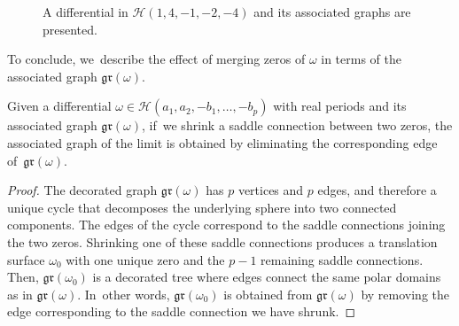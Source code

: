 \begin{ex}
\begin{figure}[ht]
\caption{A differential in $\mathcal{H}(1,4,-1,-2,-4)$ and its associated graphs are presented.} \label{fig:exgraph2}
\end{figure}
\end{ex}

To conclude, we~describe the effect of merging zeros of $\omega$ in terms of the associated graph $\mathfrak{gr}(\omega)$.
\begin{lem}\label{lem:defengraph}
Given a differential $\omega\in\mathcal{H}(a_{1},a_{2},-b_{1},\dots,-b_{p})$ with real periods and its associated graph $\mathfrak{gr}(\omega)$, if~we shrink a saddle connection between two zeros, the associated graph of the limit is obtained by eliminating the corresponding edge of~$\mathfrak{gr}(\omega)$.
\end{lem}

\begin{proof}
The decorated graph $\mathfrak{gr}(\omega)$ has $p$ vertices and $p$ edges, and therefore a unique cycle that decomposes the underlying sphere into two connected components. The edges of the cycle correspond to the saddle connections joining the two zeros. Shrinking one of these saddle connections produces a translation surface $\omega_{0}$ with one unique zero and the $p-1$ remaining saddle connections. Then, $\mathfrak{gr}(\omega_{0})$ is a decorated tree where edges connect the same polar domains as in $\mathfrak{gr}(\omega)$. In~other words, $\mathfrak{gr}(\omega_{0})$ is obtained from $\mathfrak{gr}(\omega)$ by removing the edge corresponding to the saddle connection we have shrunk.
\end{proof}

